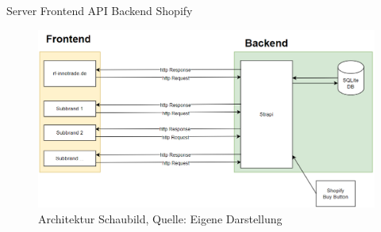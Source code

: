 Server
Frontend API Backend
Shopify

\begin{figure}[H]
    \centering
    \includegraphics[width=1\textwidth]{figures/architektur.png}
    \caption{Architektur Schaubild, Quelle: Eigene Darstellung}
	\label{fig:architekturSchaubild}
\end{figure}